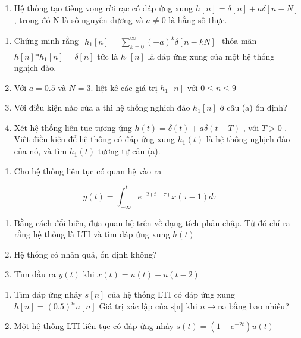 \documentclass[
  10
]{article}
\providecommand{\tightlist}{%
  \setlength{\itemsep}{0pt}\setlength{\parskip}{0pt}}
\begin{document}
\begin{enumerate}
\def\labelenumi{\arabic{enumi}.}
\setcounter{enumi}{12}
\tightlist
\item
  Hệ thống tạo tiếng vọng rời rạc có đáp ứng xung
  \(h [ n ] = \delta [ n ] + a \delta [ n - N ]\) , trong đó N là số
  nguyên dương và \(a \neq 0\) là hằng số thực.
\end{enumerate}

\begin{enumerate}
\def\labelenumi{(\alph{enumi})}
\item
  Chứng minh rằng
  \(\begin{array} { r } { h _ { 1 } [ n ] = \sum _ { k = 0 } ^ { \infty } ( - a ) ^ { k } \delta [ n - k N ] } \end{array}\)
  thỏa mãn \(h [ n ] { * h _ { 1 } } [ n ] = \delta [ n ]\) tức là
  \(h _ { 1 } [ n ]\) là đáp ứng xung của một hệ thống nghịch đảo.
\item
  Với \(a = 0 . 5\) và \(N = 3 .\) liệt kê các giá trị
  \(h _ { 1 } [ n ]\) với \(0 \leq n \leq 9\)
\item
  Với điều kiện nào của a thì hệ thống nghịch đảo \(h _ { 1 } [ n ]\) ở
  câu (a) ổn định?
\item
  Xét hệ thống liên tục tương ứng
  \(h ( t ) = \delta ( t ) + a \delta ( t - T )\) , với \(T > 0\) . Viết
  điều kiện để hệ thống có đáp ứng xung \(h _ { 1 } ( t )\) là hệ thống
  nghịch đảo của nó, và tìm \(h _ { 1 } ( t )\) tương tự câu (a).
\end{enumerate}

\begin{enumerate}
\def\labelenumi{\arabic{enumi}.}
\setcounter{enumi}{13}
\tightlist
\item
  Cho hệ thống liên tục có quan hệ vào ra
\end{enumerate}

\[
y (t) = \int_ {- \infty} ^ {t} e ^ {- 2 (t - \tau)} x (\tau - 1) d \tau
\]

\begin{enumerate}
\def\labelenumi{(\alph{enumi})}
\item
  Bằng cách đổi biến, đưa quan hệ trên về dạng tích phân chập. Từ đó chỉ
  ra rằng hệ thống là LTI và tìm đáp ứng xung \(h ( t )\)
\item
  Hệ thống có nhân quả, ổn định không?
\item
  Tìm đầu ra \(y ( t )\) khi \(x ( t ) = u ( t ) - u ( t - 2 )\)
\end{enumerate}

\begin{enumerate}
\def\labelenumi{\arabic{enumi}.}
\setcounter{enumi}{14}
\item
  Tìm đáp ứng nhảy \(s [ n ]\) của hệ thống LTI có đáp ứng xung
  \(h [ n ] = ( 0 . 5 ) ^ { n } u [ n ]\) Giá trị xác lập của s{[}n{]}
  khi \(n \to \infty\) bằng bao nhiêu?
\item
  Một hệ thống LTI liên tục có đáp ứng nhảy
  \(s ( t ) = ( 1 - e ^ { - 2 t } ) u ( t )\)
\end{enumerate}
\end{document}
